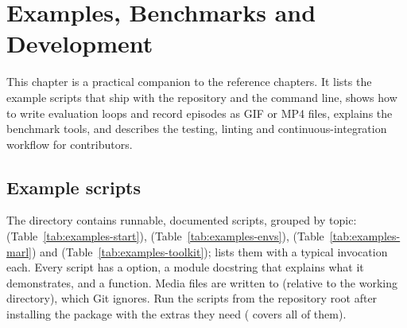 \chapter{Examples, Benchmarks and Development}\label{chap:examples}
\begingroup\setlength{\emergencystretch}{3em}%

This chapter is a practical companion to the reference chapters. It lists the
example scripts that ship with the repository and the  command
line, shows how to write evaluation loops and record episodes as GIF or MP4
files, explains the benchmark tools, and describes the testing, linting and
continuous-integration workflow for contributors.

\section{Example scripts}\label{sec:examples-catalogue}

The directory  contains runnable, documented scripts, grouped
by topic:  (Table~\ref{tab:examples-start}),
 (Table~\ref{tab:examples-envs}), 
(Table~\ref{tab:examples-marl}) and 
(Table~\ref{tab:examples-toolkit});  lists them with a
typical invocation each. Every script has a  option, a module
docstring that explains what it demonstrates, and a  function. Media files are written to
 (relative to the working directory), which Git ignores. Run
the scripts from the repository root after installing the package with the
extras they need ( covers all of them).

